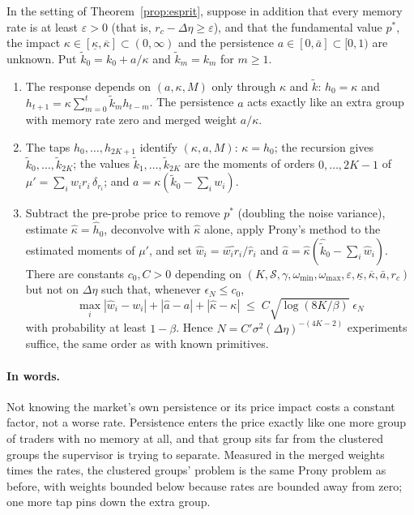 \begin{corollary}
\label{cor:unknown_primitives}
In the setting of Theorem~\ref{prop:esprit}, suppose in addition that every memory rate is at least $\varepsilon>0$ (that is, $r_c-\Delta\eta\ge\varepsilon$), and that the fundamental value $p^*$, the impact $\kappa\in[\underline\kappa,\overline\kappa]\subset(0,\infty)$ and the persistence $a\in[0,\bar a]\subset[0,1)$ are unknown. Put $\tilde k_0=k_0+a/\kappa$ and $\tilde k_m=k_m$ for $m\ge1$.
\begin{enumerate}[label=(\roman*)]
\item The response depends on $(a,\kappa,M)$ only through $\kappa$ and $\tilde k$: $h_0=\kappa$ and $h_{t+1}=\kappa\sum_{m=0}^{t}\tilde k_mh_{t-m}$. The persistence $a$ acts exactly like an extra group with memory rate zero and merged weight $a/\kappa$.
\item The taps $h_0,\ldots,h_{2K+1}$ identify $(\kappa,a,M)$: $\kappa=h_0$; the recursion gives $\tilde k_0,\ldots,\tilde k_{2K}$; the values $\tilde k_1,\ldots,\tilde k_{2K}$ are the moments of orders $0,\ldots,2K-1$ of $\mu'=\sum_iw_ir_i\,\delta_{r_i}$; and $a=\kappa(\tilde k_0-\sum_iw_i)$.
\item Subtract the pre-probe price to remove $p^*$ (doubling the noise variance), estimate $\hat\kappa=\hat h_0$, deconvolve with $\hat\kappa$ alone, apply Prony's method to the estimated moments of $\mu'$, and set $\hat w_i=\widehat{w_ir_i}/\hat r_i$ and $\hat a=\hat\kappa(\hat{\tilde k}_0-\sum_i\hat w_i)$. There are constants $c_0,C>0$ depending on $(K,\mathcal S,\gamma,\omega_{\min},\omega_{\max},\varepsilon,\underline\kappa,\overline\kappa,\bar a,r_c)$ but not on $\Delta\eta$ such that, whenever $\epsilon_N\le c_0$,
\[
\max_i|\hat w_i-w_i|+|\hat a-a|+|\hat\kappa-\kappa|\;\le\;C\sqrt{\log(8K/\beta)}\;\epsilon_N
\]
with probability at least $1-\beta$. Hence $N=C'\sigma^2(\Delta\eta)^{-(4K-2)}$ experiments suffice, the same order as with known primitives.
\end{enumerate}
\end{corollary}

\paragraph{In words.} Not knowing the market's own persistence or its price impact costs a constant factor, not a worse rate. Persistence enters the price exactly like one more group of traders with no memory at all, and that group sits far from the clustered groups the supervisor is trying to separate. Measured in the merged weights times the rates, the clustered groups' problem is the same Prony problem as before, with weights bounded below because rates are bounded away from zero; one more tap pins down the extra group.

